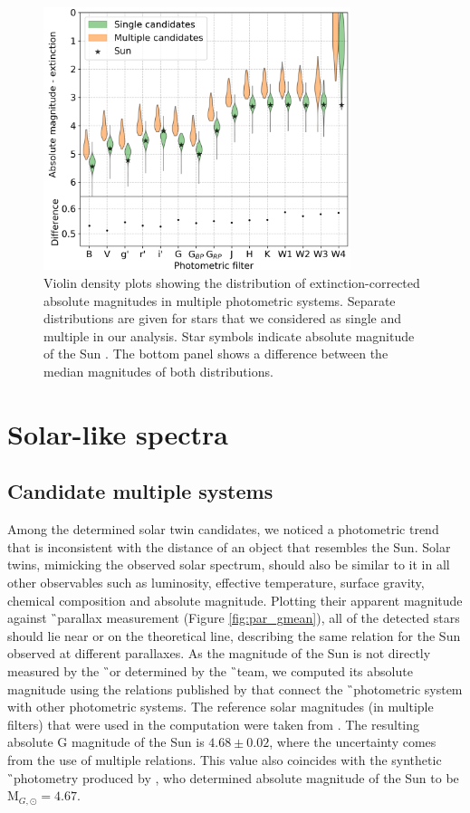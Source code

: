 \begin{figure}
	\centering
	\includegraphics[width=0.8\textwidth]{multimagplotebvc307.png}
	\caption{Violin density plots showing the distribution of extinction-corrected absolute magnitudes in multiple photometric systems. Separate distributions are given for stars that we considered as single and multiple in our analysis. Star symbols indicate absolute magnitude of the Sun \cite{2018ApJS..236...47W}. The bottom panel shows a difference between the median magnitudes of both distributions.}
	\label{fig:viol_photometry}
\end{figure}

\section{Solar-like spectra}

\subsection{Candidate multiple systems}
\label{sec:multi_cand}
Among the determined solar twin candidates, we noticed a photometric trend that is inconsistent with the distance of an object that resembles the Sun. Solar twins, mimicking the observed solar spectrum, should also be similar to it in all other observables such as luminosity, effective temperature, surface gravity, chemical composition and absolute magnitude. Plotting their apparent magnitude against \G\ parallax measurement (Figure \ref{fig:par_gmean}), all of the detected stars should lie near or on the theoretical line, describing the same relation for the Sun observed at different parallaxes. As the magnitude of the Sun is not directly measured by the \G\ or determined by the \G\ team, we computed its absolute magnitude using the relations published by \citet{2018arXiv180409368E} that connect the \G\ photometric system with other photometric systems. The reference solar magnitudes (in multiple filters) that were used in the computation were taken from \citet{2018ApJS..236...47W}. The resulting absolute G magnitude of the Sun is $4.68 \pm 0.02$, where the uncertainty comes from the use of multiple relations. This value also coincides with the synthetic \G\ photometry produced by \citet{2018MNRAS.479L.102C}, who determined absolute magnitude of the Sun to be M$_{G, \odot} = 4.67$.

